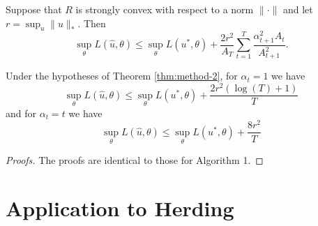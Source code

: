 \documentclass{article}
\begin{document}
\begin{theorem}
\label{thm:method-2}
Suppose that $R$ is strongly convex with respect to a norm $\|\cdot\|$ 
and let $r = \sup_{u} \|u\|_{*}$. Then 
\[ \sup_{\theta} L(\hat{u}, \theta) \leq \sup_{\theta} L(u^*, \theta) + \frac{2r^2}{A_T} \sum_{t=1}^T \frac{\alpha_{t+1}^2A_t}{A_{t+1}^2}. \]
\end{theorem}
\begin{corollary}
\label{cor:method-2}
Under the hypotheses of Theorem \ref{thm:method-2}, for $\alpha_t = 1$ we have
\[ \sup_{\theta} L(\hat{u}, \theta) \leq \sup_{\theta} L(u^*, \theta) + \frac{2r^2(\log(T) + 1)}{T} \]
and for $\alpha_t = t$ we have
\[ \sup_{\theta} L(\hat{u}, \theta) \leq \sup_{\theta} L(u^*, \theta) + \frac{8r^2}{T} \]
\end{corollary}
\begin{proof}[Proofs]
The proofs are identical to those for Algorithm 1.
\end{proof}

\section{Application to Herding}
\label{sec:herding}
\end{document}
